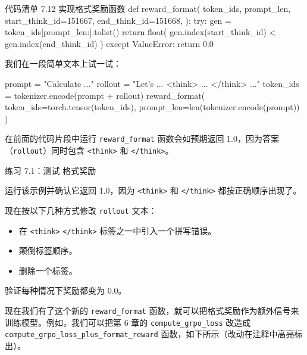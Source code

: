 \begin{codeboxt}{代码清单 7.12 实现格式奖励函数}
def reward_format(
    token_ids,
    prompt_len,
    start_think_id=151667,
    end_think_id=151668,
):
    try:
        gen = token_ids[prompt_len:].tolist()
        return float(
            gen.index(start_think_id) < gen.index(end_think_id)
        )
    except ValueError:
        return 0.0
\end{codeboxt}


我们在一段简单文本上试一试：

\begin{codebox}
prompt = "Calculate ..."
rollout = "Let's ... <think> ... </think> ..."
token_ids = tokenizer.encode(prompt + rollout)
reward_format(
    token_ids=torch.tensor(token_ids),
    prompt_len=len(tokenizer.encode(prompt))
)
\end{codebox}

在前面的代码片段中运行 \texttt{reward\_format} 函数会如预期返回 1.0，因为答案（\texttt{rollout}）同时包含 \texttt{\textless{}think\textgreater{}} 和 \texttt{\textless{}/think\textgreater{}}。

\begin{mySidebar}{练习 7.1：测试  格式奖励}

运行该示例并确认它返回 1.0，因为 \texttt{\textless{}think\textgreater{}} 和 \texttt{\textless{}/think\textgreater{}} 都按正确顺序出现了。

现在按以下几种方式修改 \texttt{rollout} 文本：

\begin{itemize}
\item 在 \texttt{\textless{}think\textgreater{}} \texttt{\textless{}/think\textgreater{}} 标签之一中引入一个拼写错误。
\item 颠倒标签顺序。
\item 删除一个标签。
\end{itemize}

验证每种情况下奖励都变为 0.0。

\end{mySidebar}

现在我们有了这个新的 \texttt{reward\_format} 函数，就可以把格式奖励作为额外信号来训练模型。例如，我们可以把第 6 章的 \texttt{compute\_grpo\_loss} 改造成 \texttt{compute\_grpo\_loss\_plus\_format\_reward} 函数，如下所示（改动在注释中高亮标出）。

